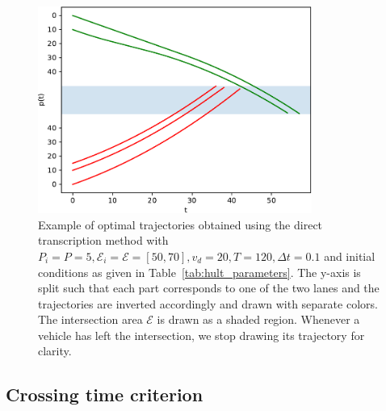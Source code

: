\documentclass[a4paper]{article}
\theoremstyle{definition}
\theoremstyle{plain}
\begin{document}
\begin{figure}[H]
  \centering
  \includegraphics[width=0.8\textwidth]{figures/direct_transcription_example.pdf}
  \caption{Example of optimal trajectories obtained using the direct
    transcription method with
    $P_{i} = P = 5, \mathcal{E}_{i} = \mathcal{E} = [50, 70], v_{d} = 20, T=120, \Delta t = 0.1$
    and initial conditions as given in Table~\ref{tab:hult_parameters}. The
    y-axis is split such that each part corresponds to one of the two lanes and
    the trajectories are inverted accordingly and drawn with separate colors.
    The intersection area $\mathcal{E}$ is drawn as a shaded region. Whenever a
    vehicle has left the intersection, we stop drawing its trajectory for
    clarity.}
  \label{fig:direct_transcription_example}
\end{figure}


\subsection*{Crossing time criterion}
\end{document}
